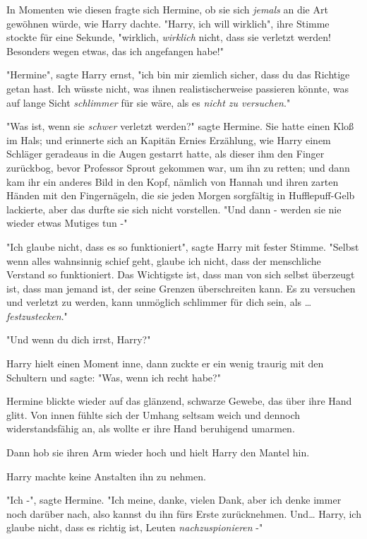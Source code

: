{In Momenten wie diesen fragte sich Hermine, ob sie sich \emph{jemals} an die Art gewöhnen würde, wie Harry dachte. "Harry, ich will wirklich", ihre Stimme stockte für eine Sekunde, "wirklich, \emph{wirklich} nicht, dass sie verletzt werden! Besonders wegen etwas, das ich angefangen habe!"

"Hermine", sagte Harry ernst, "ich bin mir ziemlich sicher, dass du das Richtige getan hast. Ich wüsste nicht, was ihnen realistischerweise passieren könnte, was auf lange Sicht \emph{schlimmer} für sie wäre, als es \emph{nicht zu versuchen}."

"Was ist, wenn sie \emph{schwer} verletzt werden?" sagte Hermine. Sie hatte einen Kloß im Hals; und erinnerte sich an Kapitän Ernies Erzählung, wie Harry einem Schläger geradeaus in die Augen gestarrt hatte, als dieser ihm den Finger zurückbog, bevor Professor Sprout gekommen war, um ihn zu retten; und dann kam ihr ein anderes Bild in den Kopf, nämlich von Hannah und ihren zarten Händen mit den Fingernägeln, die sie jeden Morgen sorgfältig in Hufflepuff-Gelb lackierte, aber das durfte sie sich nicht vorstellen. "Und dann - werden sie nie wieder etwas Mutiges tun -"

"Ich glaube nicht, dass es so funktioniert", sagte Harry mit fester Stimme. "Selbst wenn alles wahnsinnig schief geht, glaube ich nicht, dass der menschliche Verstand so funktioniert. Das Wichtigste ist, dass man von sich selbst überzeugt ist, dass man jemand ist, der seine Grenzen überschreiten kann. Es zu versuchen und verletzt zu werden, kann unmöglich schlimmer für dich sein, als … \emph{festzustecken}."

"Und wenn du dich irrst, Harry?"

Harry hielt einen Moment inne, dann zuckte er ein wenig traurig mit den Schultern und sagte: "Was, wenn ich recht habe?"

Hermine blickte wieder auf das glänzend, schwarze Gewebe, das über ihre Hand glitt. Von innen fühlte sich der Umhang seltsam weich und dennoch widerstandsfähig an, als wollte er ihre Hand beruhigend umarmen.

Dann hob sie ihren Arm wieder hoch und hielt Harry den Mantel hin.

Harry machte keine Anstalten ihn zu nehmen.

"Ich -", sagte Hermine. "Ich meine, danke, vielen Dank, aber ich denke immer noch darüber nach, also kannst du ihn fürs Erste zurücknehmen. Und… Harry, ich glaube nicht, dass es richtig ist, Leuten \emph{nachzuspionieren} -"

}
